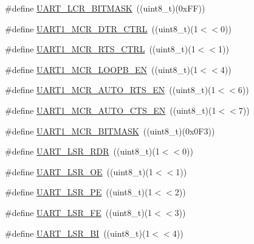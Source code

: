 \begin{DoxyCompactItemize}
\item 
\#define \hyperlink{group___u_a_r_t___private___macros_ga28e31fe85eeeb124ff6a471978155356}{\-U\-A\-R\-T\-\_\-\-L\-C\-R\-\_\-\-B\-I\-T\-M\-A\-S\-K}~((uint8\-\_\-t)(0x\-F\-F))
\item 
\#define \hyperlink{group___u_a_r_t___private___macros_ga8ca301061bda466b0e62ff182938a19e}{\-U\-A\-R\-T1\-\_\-\-M\-C\-R\-\_\-\-D\-T\-R\-\_\-\-C\-T\-R\-L}~((uint8\-\_\-t)(1$<$$<$0))
\item 
\#define \hyperlink{group___u_a_r_t___private___macros_ga2e84ce056119e87adccff0b8cec560b1}{\-U\-A\-R\-T1\-\_\-\-M\-C\-R\-\_\-\-R\-T\-S\-\_\-\-C\-T\-R\-L}~((uint8\-\_\-t)(1$<$$<$1))
\item 
\#define \hyperlink{group___u_a_r_t___private___macros_ga2c22f6069fc2d3d621cd8b2e578d69a3}{\-U\-A\-R\-T1\-\_\-\-M\-C\-R\-\_\-\-L\-O\-O\-P\-B\-\_\-\-E\-N}~((uint8\-\_\-t)(1$<$$<$4))
\item 
\#define \hyperlink{group___u_a_r_t___private___macros_gafe3631c1413e045686f07f3716e0baed}{\-U\-A\-R\-T1\-\_\-\-M\-C\-R\-\_\-\-A\-U\-T\-O\-\_\-\-R\-T\-S\-\_\-\-E\-N}~((uint8\-\_\-t)(1$<$$<$6))
\item 
\#define \hyperlink{group___u_a_r_t___private___macros_gac7f7f4cc9428e643c0bb4058e7fcb022}{\-U\-A\-R\-T1\-\_\-\-M\-C\-R\-\_\-\-A\-U\-T\-O\-\_\-\-C\-T\-S\-\_\-\-E\-N}~((uint8\-\_\-t)(1$<$$<$7))
\item 
\#define \hyperlink{group___u_a_r_t___private___macros_gafa1c3230af66a8c33f1febd18a1bf320}{\-U\-A\-R\-T1\-\_\-\-M\-C\-R\-\_\-\-B\-I\-T\-M\-A\-S\-K}~((uint8\-\_\-t)(0x0\-F3))
\item 
\#define \hyperlink{group___u_a_r_t___private___macros_ga3d83de31d722cd373ee69a2a38aaed43}{\-U\-A\-R\-T\-\_\-\-L\-S\-R\-\_\-\-R\-D\-R}~((uint8\-\_\-t)(1$<$$<$0))
\item 
\#define \hyperlink{group___u_a_r_t___private___macros_ga85c4312a700f6033bf0a075ae41de57c}{\-U\-A\-R\-T\-\_\-\-L\-S\-R\-\_\-\-O\-E}~((uint8\-\_\-t)(1$<$$<$1))
\item 
\#define \hyperlink{group___u_a_r_t___private___macros_ga3ae0ee26be22b855aa08d68a2801d3d2}{\-U\-A\-R\-T\-\_\-\-L\-S\-R\-\_\-\-P\-E}~((uint8\-\_\-t)(1$<$$<$2))
\item 
\#define \hyperlink{group___u_a_r_t___private___macros_ga18b1661d7c37ab40c9310311dd4f647d}{\-U\-A\-R\-T\-\_\-\-L\-S\-R\-\_\-\-F\-E}~((uint8\-\_\-t)(1$<$$<$3))
\item 
\#define \hyperlink{group___u_a_r_t___private___macros_gaaca4bb43e62c7085534b67576e1ddbeb}{\-U\-A\-R\-T\-\_\-\-L\-S\-R\-\_\-\-B\-I}~((uint8\-\_\-t)(1$<$$<$4))

\end{DoxyCompactItemize}
